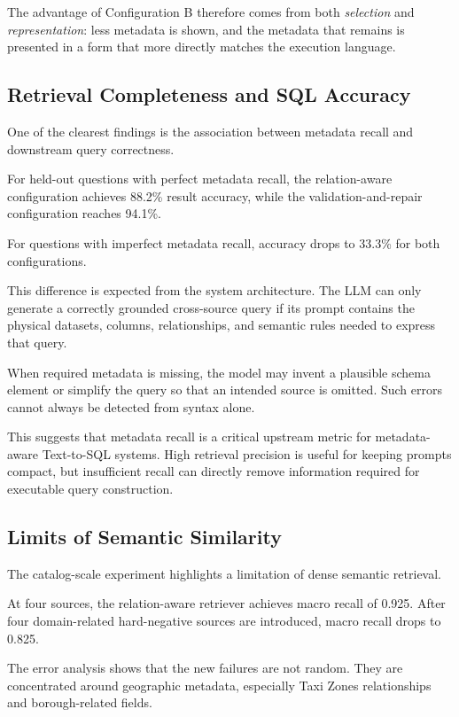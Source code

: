 The advantage of Configuration B therefore comes from both
\emph{selection} and \emph{representation}: less metadata is shown, and the
metadata that remains is presented in a form that more directly matches the
execution language.


\subsection{Retrieval Completeness and SQL Accuracy}

One of the clearest findings is the association between metadata recall and
downstream query correctness.

For held-out questions with perfect metadata recall, the relation-aware
configuration achieves 88.2\% result accuracy, while the validation-and-repair
configuration reaches 94.1\%.

For questions with imperfect metadata recall, accuracy drops to 33.3\% for
both configurations.

This difference is expected from the system architecture. The LLM can only
generate a correctly grounded cross-source query if its prompt contains the
physical datasets, columns, relationships, and semantic rules needed to
express that query.

When required metadata is missing, the model may invent a plausible schema
element or simplify the query so that an intended source is omitted. Such
errors cannot always be detected from syntax alone.

This suggests that metadata recall is a critical upstream metric for
metadata-aware Text-to-SQL systems. High retrieval precision is useful for
keeping prompts compact, but insufficient recall can directly remove
information required for executable query construction.


\subsection{Limits of Semantic Similarity}

The catalog-scale experiment highlights a limitation of dense semantic
retrieval.

At four sources, the relation-aware retriever achieves macro recall of 0.925.
After four domain-related hard-negative sources are introduced, macro recall
drops to 0.825.

The error analysis shows that the new failures are not random. They are
concentrated around geographic metadata, especially Taxi Zones relationships
and borough-related fields.

